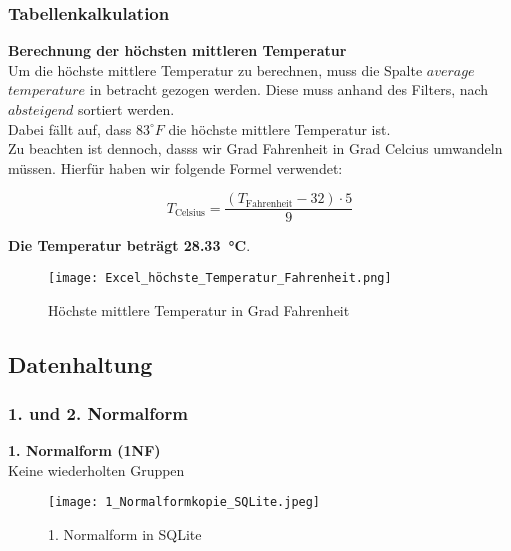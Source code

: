 \documentclass[a4paper,12pt]{article}
\begin{document}
\newpage

\subsubsection{Tabellenkalkulation}

\textbf{Berechnung der höchsten mittleren Temperatur}
\\Um die höchste mittlere Temperatur zu berechnen, muss die Spalte $average$ $temperature$ in betracht gezogen werden. Diese muss anhand des Filters, nach $absteigend$ sortiert werden. \\Dabei fällt auf, dass $83^\circ F$ die höchste mittlere Temperatur ist. \\Zu beachten ist dennoch, dasss wir Grad Fahrenheit in Grad Celcius umwandeln müssen. Hierfür haben wir folgende Formel verwendet:

\vspace{0.5cm}


\[
T_{\text{Celsius}} = \frac{(T_{\text{Fahrenheit}} - 32) \cdot 5}{9}
\]

\vspace{0.5cm}
\begin{center}

\textbf{Die Temperatur beträgt \SI{28,33}{\degreeCelsius}}.
\end{center}


\begin{figure}[h]
    \centering 
    \texttt{[image: Excel\_höchste\_Temperatur\_Fahrenheit.png]}
    \caption{Höchste mittlere Temperatur in Grad Fahrenheit}
    \label{fig:normalform1}
\end{figure}


    
\subsection{Datenhaltung}
\subsubsection{1. und 2. Normalform}
\textbf{1. Normalform (1NF)} \\Keine wiederholten Gruppen

\begin{figure}[h]
    \centering
    \texttt{[image: 1\_Normalformkopie\_SQLite.jpeg]}
    \caption{1. Normalform in SQLite}
    \label{fig:enter-label}
\end{figure}
\end{document}
